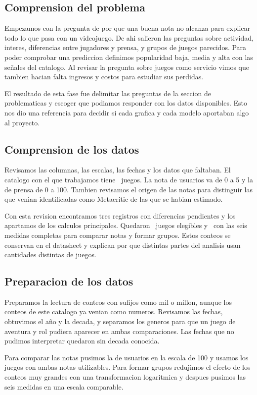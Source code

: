 \subsection{Comprension del problema}
Empezamos con la pregunta de por que una buena nota no alcanza para explicar todo lo que pasa con un videojuego. De ahi salieron las preguntas sobre actividad, interes, diferencias entre jugadores y prensa, y grupos de juegos parecidos. Para poder comprobar una prediccion definimos popularidad baja, media y alta con las señales del catalogo. Al revisar la pregunta sobre juegos como servicio vimos que tambien hacian falta ingresos y costos para estudiar sus perdidas.

El resultado de esta fase fue delimitar las preguntas de la seccion de problematicas y escoger que podiamos responder con los datos disponibles. Esto nos dio una referencia para decidir si cada grafica y cada modelo aportaban algo al proyecto.

\subsection{Comprension de los datos}
Revisamos las columnas, las escalas, las fechas y los datos que faltaban. El catalogo con el que trabajamos tiene \Catalogo\ juegos. La nota de usuarios va de 0 a 5 y la de prensa de 0 a 100. Tambien revisamos el origen de las notas para distinguir las que venian identificadas como Metacritic de las que se habian estimado.

Con esta revision encontramos tres registros con diferencias pendientes y los apartamos de los calculos principales. Quedaron \Elegibles\ juegos elegibles y \Pares\ con las seis medidas completas para comparar notas y formar grupos. Estos conteos se conservan en el datasheet y explican por que distintas partes del analisis usan cantidades distintas de juegos.

\subsection{Preparacion de los datos}
Preparamos la lectura de conteos con sufijos como mil o millon, aunque los conteos de este catalogo ya venian como numeros. Revisamos las fechas, obtuvimos el año y la decada, y separamos los generos para que un juego de aventura y rol pudiera aparecer en ambas comparaciones. Las fechas que no pudimos interpretar quedaron sin decada conocida.

Para comparar las notas pusimos la de usuarios en la escala de 100 y usamos los juegos con ambas notas utilizables. Para formar grupos redujimos el efecto de los conteos muy grandes con una transformacion logaritmica y despues pusimos las seis medidas en una escala comparable.

